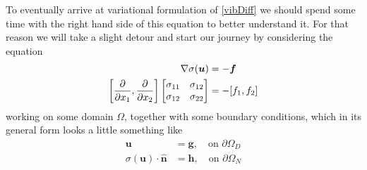 \documentclass[paper=a4, fontsize=11pt]{scrartcl} %
\begin{document}
To eventually arrive at variational formulation of \ref{vibDiff} we should spend some time with the right hand side of this equation to better understand it. For that reason we will take a slight detour and start our journey by considering the equation
\begin{align}
\label{linEl}
\nabla \sigma(\boldsymbol{u}) &= - \boldsymbol{f} \\
\left[\frac{\partial}{\partial x_1},  \frac{\partial}{\partial x_2}\right]\begin{bmatrix}
\sigma_{11} & \sigma_{12} \\
\sigma_{12} & \sigma_{22}
\end{bmatrix} &= -[f_1,f_2] \notag
\end{align}
working on some domain $\Omega$,
together with some boundary conditions, which in its general form looks a little something like
\begin{align*}
\boldsymbol{u} &= \boldsymbol{g}, \quad \text{on } \partial \Omega_D \\
\sigma(\boldsymbol{u})\cdot \boldsymbol{\hat{n}} &= \boldsymbol{h}, \quad \text{on } \partial \Omega_N
\end{align*}
\end{document}
